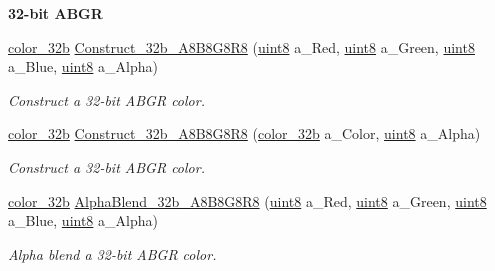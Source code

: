 \begin{Indent}{\bf 32-\/bit ABGR}\par
\begin{DoxyCompactItemize}
\item 
\hyperlink{namespacetil_a8eb2d871b8a6ffb55b3eeb720207a6cb}{color\_\-32b} \hyperlink{namespacetil_a9910d275ad1592463eb89634423d7110}{Construct\_\-32b\_\-A8B8G8R8} (\hyperlink{namespacetil_a7a75b0e7e2cd3f19ea51c8c02fd242f8}{uint8} a\_\-Red, \hyperlink{namespacetil_a7a75b0e7e2cd3f19ea51c8c02fd242f8}{uint8} a\_\-Green, \hyperlink{namespacetil_a7a75b0e7e2cd3f19ea51c8c02fd242f8}{uint8} a\_\-Blue, \hyperlink{namespacetil_a7a75b0e7e2cd3f19ea51c8c02fd242f8}{uint8} a\_\-Alpha)
\begin{DoxyCompactList}\small\item\em Construct a 32-\/bit ABGR color. \item\end{DoxyCompactList}\item 
\hyperlink{namespacetil_a8eb2d871b8a6ffb55b3eeb720207a6cb}{color\_\-32b} \hyperlink{namespacetil_a59b7c2ae7112fe3cff94e67826fca681}{Construct\_\-32b\_\-A8B8G8R8} (\hyperlink{namespacetil_a8eb2d871b8a6ffb55b3eeb720207a6cb}{color\_\-32b} a\_\-Color, \hyperlink{namespacetil_a7a75b0e7e2cd3f19ea51c8c02fd242f8}{uint8} a\_\-Alpha)
\begin{DoxyCompactList}\small\item\em Construct a 32-\/bit ABGR color. \item\end{DoxyCompactList}\item 
\hyperlink{namespacetil_a8eb2d871b8a6ffb55b3eeb720207a6cb}{color\_\-32b} \hyperlink{namespacetil_a1ff33e54fd1c245f093a779b13e9ec43}{AlphaBlend\_\-32b\_\-A8B8G8R8} (\hyperlink{namespacetil_a7a75b0e7e2cd3f19ea51c8c02fd242f8}{uint8} a\_\-Red, \hyperlink{namespacetil_a7a75b0e7e2cd3f19ea51c8c02fd242f8}{uint8} a\_\-Green, \hyperlink{namespacetil_a7a75b0e7e2cd3f19ea51c8c02fd242f8}{uint8} a\_\-Blue, \hyperlink{namespacetil_a7a75b0e7e2cd3f19ea51c8c02fd242f8}{uint8} a\_\-Alpha)
\begin{DoxyCompactList}\small\item\em Alpha blend a 32-\/bit ABGR color. \item\end{DoxyCompactList}\end{DoxyCompactItemize}
\end{Indent}
